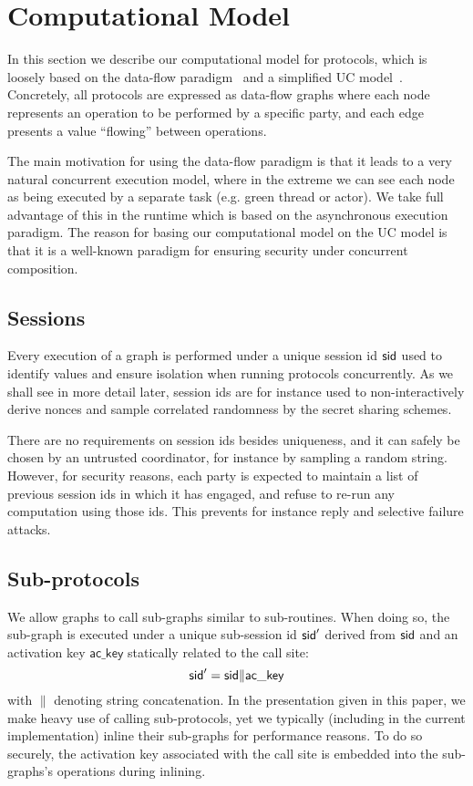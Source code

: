 \section{Computational Model}

In this section we describe our computational model for protocols, which is loosely based on the data-flow paradigm~\cite{abadi16} and a simplified UC model~\cite{canetti-cohen-lindell15}. Concretely, all protocols are expressed as data-flow graphs where each node represents an operation to be performed by a specific party, and each edge presents a value ``flowing'' between operations.

The main motivation for using the data-flow paradigm is that it leads to a very natural concurrent execution model, where in the extreme we can see each node as being executed by a separate task (e.g. green thread or actor). We take full advantage of this in the runtime which is based on the asynchronous execution paradigm. The reason for basing our computational model on the UC model is that it is a well-known paradigm for ensuring security under concurrent composition.


\subsection{Sessions}

Every execution of a graph is performed under a unique session id $\mathsf{sid}$ used to identify values and ensure isolation when running protocols concurrently. As we shall see in more detail later, session ids are for instance used to non-interactively derive nonces and sample correlated randomness by the secret sharing schemes.

There are no requirements on session ids besides uniqueness, and it can safely be chosen by an untrusted coordinator, for instance by sampling a random string. However, for security reasons, each party is expected to maintain a list of previous session ids in which it has engaged, and refuse to re-run any computation using those ids. This prevents for instance reply and selective failure attacks.


\subsection{Sub-protocols}

We allow graphs to call sub-graphs similar to sub-routines. When doing so, the sub-graph is executed under a unique sub-session id $\mathsf{sid}'$ derived from $\mathsf{sid}$ and an activation key $\mathsf{ac\_key}$ statically related to the call site: 
$$
\mathsf{sid}' = \mathsf{sid} \| \mathsf{ac\_key}
$$
with $\|$ denoting string concatenation. In the presentation given in this paper, we make heavy use of calling sub-protocols, yet we typically (including in the current implementation) inline their sub-graphs for performance reasons. To do so securely, the activation key associated with the call site is embedded into the sub-graphs's operations during inlining.

